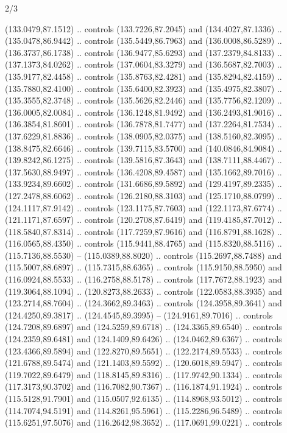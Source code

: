 \begin{flagdescription}{2/3}
\begin{scope}[shift={(0.5\flaglength,0.5)},scale=\flagwidth/320]
\begin{scope}[y=0.8pt, x=0.8pt, yscale=-1,shift={(-118.3,-146)}]
  (133.0479,87.1512) .. controls (133.7226,87.2045) and (134.4027,87.1336) ..
  (135.0478,86.9442) .. controls (135.5449,86.7963) and (136.0008,86.5289) ..
  (136.3737,86.1738) .. controls (136.9477,85.6293) and (137.2379,84.8133) ..
  (137.1373,84.0262) .. controls (137.0604,83.3279) and (136.5687,82.7003) ..
  (135.9177,82.4458) .. controls (135.8763,82.4281) and (135.8294,82.4159) ..
  (135.7880,82.4100) .. controls (135.6400,82.3923) and (135.4975,82.3807) ..
  (135.3555,82.3748) .. controls (135.5626,82.2446) and (135.7756,82.1209) ..
  (136.0005,82.0084) .. controls (136.1248,81.9492) and (136.2493,81.9016) ..
  (136.3854,81.8601) .. controls (136.7878,81.7477) and (137.2264,81.7534) ..
  (137.6229,81.8836) .. controls (138.0905,82.0375) and (138.5160,82.3095) ..
  (138.8475,82.6646) .. controls (139.7115,83.5700) and (140.0846,84.9084) ..
  (139.8242,86.1275) .. controls (139.5816,87.3643) and (138.7111,88.4467) ..
  (137.5630,88.9497) .. controls (136.4208,89.4587) and (135.1662,89.7016) ..
  (133.9234,89.6602) .. controls (131.6686,89.5892) and (129.4197,89.2335) ..
  (127.2478,88.6062) .. controls (126.2180,88.3103) and (125.1710,88.0799) ..
  (124.1117,87.9142) .. controls (123.1175,87.7603) and (122.1173,87.6774) ..
  (121.1171,87.6597) .. controls (120.2708,87.6419) and (119.4185,87.7012) ..
  (118.5840,87.8314) .. controls (117.7259,87.9616) and (116.8791,88.1628) ..
  (116.0565,88.4350) .. controls (115.9441,88.4765) and (115.8320,88.5116) ..
  (115.7136,88.5530) -- (115.0389,88.8020) .. controls (115.2697,88.7488) and
  (115.5007,88.6897) .. (115.7315,88.6365) .. controls (115.9150,88.5950) and
  (116.0924,88.5533) .. (116.2758,88.5178) .. controls (117.7672,88.1923) and
  (119.3064,88.1094) .. (120.8273,88.2633) .. controls (122.0583,88.3935) and
  (123.2714,88.7604) .. (124.3662,89.3463) .. controls (124.3958,89.3641) and
  (124.4250,89.3817) .. (124.4545,89.3995) -- (124.9161,89.7016) .. controls
  (124.7208,89.6897) and (124.5259,89.6718) .. (124.3365,89.6540) .. controls
  (124.2359,89.6481) and (124.1409,89.6426) .. (124.0462,89.6367) .. controls
  (123.4366,89.5894) and (122.8270,89.5651) .. (122.2174,89.5533) .. controls
  (121.6788,89.5474) and (121.1403,89.5592) .. (120.6018,89.5947) .. controls
  (119.7022,89.6479) and (118.8145,89.8316) .. (117.9742,90.1334) .. controls
  (117.3173,90.3702) and (116.7082,90.7367) .. (116.1874,91.1924) .. controls
  (115.5128,91.7901) and (115.0507,92.6135) .. (114.8968,93.5012) .. controls
  (114.7074,94.5191) and (114.8261,95.5961) .. (115.2286,96.5489) .. controls
  (115.6251,97.5076) and (116.2642,98.3652) .. (117.0691,99.0221) .. controls

\end{scope}
\end{scope}
\end{flagdescription}
